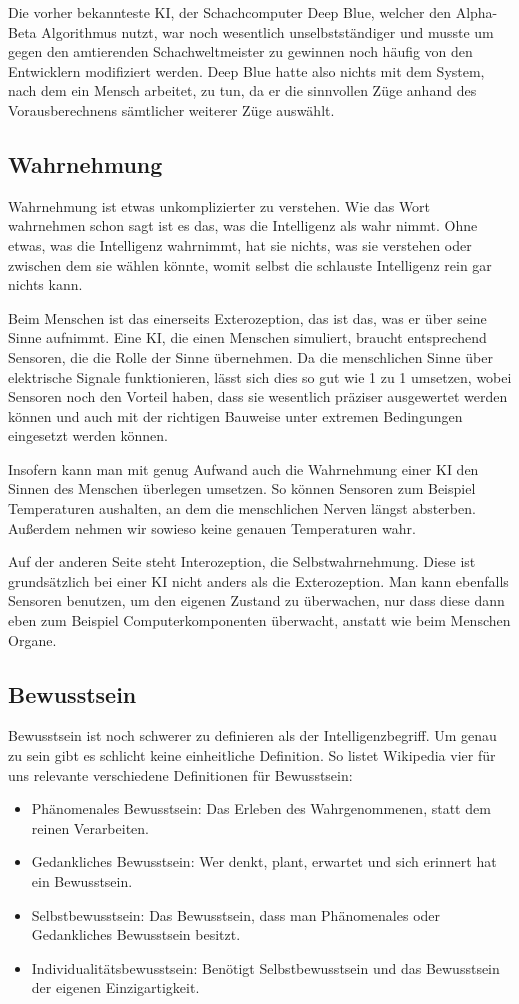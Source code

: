 Die vorher bekannteste KI, der Schachcomputer Deep Blue, welcher den Alpha-Beta Algorithmus nutzt, war noch wesentlich unselbstständiger und musste um gegen den amtierenden Schachweltmeister zu gewinnen noch häufig von den Entwicklern modifiziert werden.
Deep Blue hatte also nichts mit dem System, nach dem ein Mensch arbeitet, zu tun, da er die sinnvollen Züge anhand des Vorausberechnens sämtlicher weiterer Züge auswählt.

\subsection{Wahrnehmung}
Wahrnehmung ist etwas unkomplizierter zu verstehen.
Wie das Wort wahrnehmen schon sagt ist es das, was die Intelligenz als wahr nimmt.
Ohne etwas, was die Intelligenz wahrnimmt, hat sie nichts, was sie verstehen oder zwischen dem sie wählen könnte, womit selbst die schlauste Intelligenz rein gar nichts kann.

Beim Menschen ist das einerseits Exterozeption, das ist das, was er über seine Sinne aufnimmt.
Eine KI, die einen Menschen simuliert, braucht entsprechend Sensoren, die die Rolle der Sinne übernehmen.
Da die menschlichen Sinne über elektrische Signale funktionieren, lässt sich dies so gut wie 1 zu 1 umsetzen, wobei Sensoren noch den Vorteil haben, dass sie wesentlich präziser ausgewertet werden können und auch mit der richtigen Bauweise unter extremen Bedingungen eingesetzt werden können.


Insofern kann man mit genug Aufwand auch die Wahrnehmung einer KI den Sinnen des Menschen überlegen umsetzen.
So können Sensoren zum Beispiel Temperaturen aushalten, an dem die menschlichen Nerven längst absterben.
Außerdem nehmen wir sowieso keine genauen Temperaturen wahr.


Auf der anderen Seite steht Interozeption, die Selbstwahrnehmung.
Diese ist grundsätzlich bei einer KI nicht anders als die Exterozeption.
Man kann ebenfalls Sensoren benutzen, um den eigenen Zustand zu überwachen, nur dass diese dann eben zum Beispiel Computerkomponenten überwacht, anstatt wie beim Menschen Organe.

\subsection{Bewusstsein}
Bewusstsein ist noch schwerer zu definieren als der Intelligenzbegriff.
Um genau zu sein gibt es schlicht keine einheitliche Definition.
So listet Wikipedia vier für uns relevante verschiedene Definitionen für Bewusstsein:
\begin{itemize}
\item Phänomenales Bewusstsein: Das Erleben des Wahrgenommenen, statt dem reinen Verarbeiten.
\item Gedankliches Bewusstsein: Wer denkt, plant, erwartet und sich erinnert hat ein Bewusstsein.
\item Selbstbewusstsein: Das Bewusstsein, dass man Phänomenales oder Gedankliches Bewusstsein besitzt.
\item Individualitätsbewusstsein: Benötigt Selbstbewusstsein und das Bewusstsein der eigenen Einzigartigkeit.
\end{itemize}

